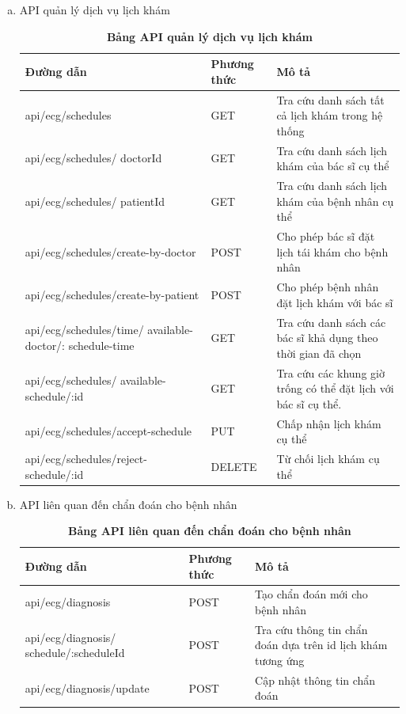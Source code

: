 \begin{enumerate}[a)]
\item API quản lý dịch vụ lịch khám
\begin{xltabular}{\textwidth}{
  | >{\raggedright\arraybackslash}m{4.5cm}
  | >{\centering\arraybackslash}m{2.8cm}
  | >{\raggedright\arraybackslash}X |
  }
  \caption{\bfseries \fontsize{12pt}{0pt}\selectfont Bảng API quản lý dịch vụ lịch khám}
  \label{table_api_schedule}
  \\
  \hline
  \bfseries Đường dẫn    &\bfseries Phương thức    &\bfseries Mô tả\\ \hline
  api/ecg/schedules   &   GET  & Tra cứu danh sách tất cả lịch khám trong hệ thống \\ \hline
  api/ecg/schedules/ doctorId  &    GET    & Tra cứu danh sách lịch khám của bác sĩ cụ thể \\ \hline
  api/ecg/schedules/ patientId  &    GET    & Tra cứu danh sách lịch khám của bệnh nhân cụ thể \\ \hline
  api/ecg/schedules/create-by-doctor  &    POST    & Cho phép bác sĩ đặt lịch tái khám cho bệnh nhân \\ \hline
  api/ecg/schedules/create-by-patient  &    POST    & Cho phép bệnh nhân đặt lịch khám với bác sĩ \\ \hline
  api/ecg/schedules/time/ available-doctor/: schedule-time  &    GET    & Tra cứu danh sách các bác sĩ khả dụng theo thời gian đã chọn \\ \hline
  api/ecg/schedules/ available-schedule/:id  &    GET    & Tra cứu các khung giờ trống có thể đặt lịch với bác sĩ cụ thể. \\ \hline
  api/ecg/schedules/accept-schedule  &    PUT    & Chấp nhận lịch khám cụ thể \\ \hline
  api/ecg/schedules/reject-schedule/:id  &    DELETE    & Từ chối lịch khám cụ thể \\ \hline
  \end{xltabular}

\item API liên quan đến chẩn đoán cho bệnh nhân
\begin{xltabular}{\textwidth}{
  | >{\raggedright\arraybackslash}m{4.5cm}
  | >{\centering\arraybackslash}m{2.8cm}
  | >{\raggedright\arraybackslash}X |
  }
  \caption{\bfseries \fontsize{12pt}{0pt}\selectfont Bảng API liên quan đến chẩn đoán cho bệnh nhân}
  \label{table_api_diagnosis}
  \\
  \hline
  \bfseries Đường dẫn    &\bfseries Phương thức    &\bfseries Mô tả\\ \hline
  api/ecg/diagnosis   &   POST  & Tạo chẩn đoán mới cho bệnh nhân \\ \hline
  api/ecg/diagnosis/ schedule/:scheduleId   &   POST  & Tra cứu thông tin chẩn đoán dựa trên id lịch khám tương ứng\\ \hline
  api/ecg/diagnosis/update   &   POST  & Cập nhật thông tin chẩn đoán \\ \hline
  \end{xltabular}



\end{enumerate}
